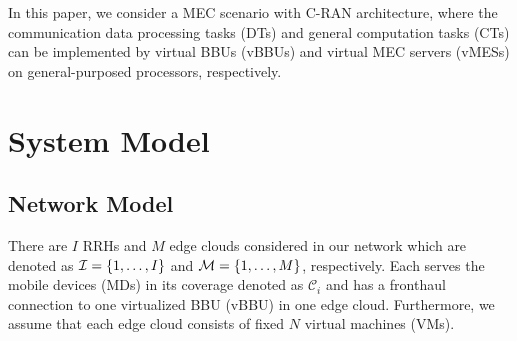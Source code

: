 \documentclass[journal, 12pt, onecolumn, draftclsnofoot]{IEEEtran}
\DeclarePairedDelimiter{\set}{\{}{\}}
\begin{document}
In this paper, we consider a MEC scenario with C-RAN architecture,
where the communication data processing tasks (DTs) and general computation tasks (CTs) can be implemented by virtual BBUs (vBBUs) and virtual MEC servers (vMESs) on general-purposed processors, respectively.

\section{System Model}
\subsection{Network Model}
There are $I$ RRHs and $M$ edge clouds considered in our network which are denoted as $\mathcal{I}=\set{1,\dots,I}$ and $\mathcal{M}=\set{1,\dots,M}$, respectively.
Each serves the mobile devices (MDs) in its coverage denoted as $\mathcal{C}_{i}$ and has a fronthaul connection to one virtualized BBU (vBBU) in one edge cloud.
Furthermore, we assume that each edge cloud consists of fixed $N$ virtual machines (VMs).
\end{document}
